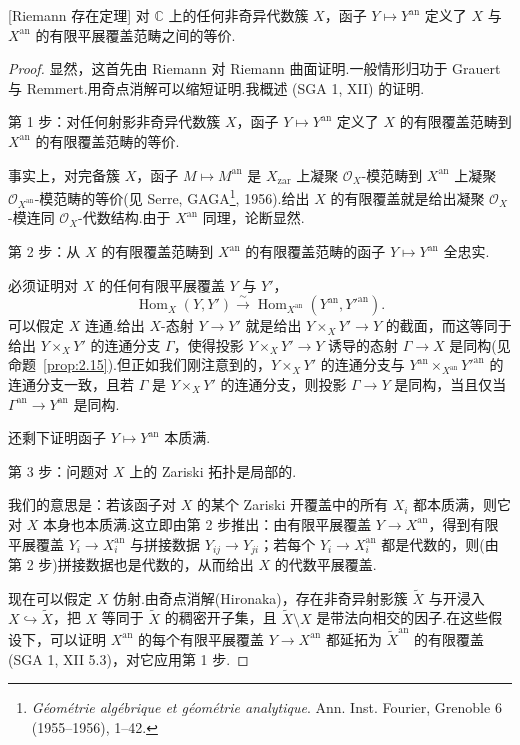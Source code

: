 \begin{theorem}\label{thm:21.3}[Riemann 存在定理]
对 $\mathbb{C}$ 上的任何非奇异代数簇 $X$，函子 $Y \mapsto Y^{\mathrm{an}}$ 定义了 $X$ 与 $X^{\mathrm{an}}$ 的有限平展覆盖范畴之间的等价.
\end{theorem}

\begin{proof}
显然，这首先由 Riemann 对 Riemann 曲面证明.一般情形归功于 Grauert 与 Remmert.用奇点消解可以缩短证明.我概述 (SGA 1, XII) 的证明.

第 1 步：对任何射影非奇异代数簇 $X$，函子 $Y \mapsto Y^{\mathrm{an}}$ 定义了 $X$ 的有限覆盖范畴到 $X^{\mathrm{an}}$ 的有限覆盖范畴的等价.

事实上，对完备簇 $X$，函子 $M \mapsto M^{\mathrm{an}}$ 是 $X_{\mathrm{zar}}$ 上凝聚 $\mathcal{O}_X$-模范畴到 $X^{\mathrm{an}}$ 上凝聚 $\mathcal{O}_{X^{\mathrm{an}}}$-模范畴的等价(见 Serre, GAGA\footnote{\emph{G\'eom\'etrie alg\'ebrique et g\'eom\'etrie analytique}. Ann. Inst. Fourier, Grenoble 6 (1955--1956), 1--42.}, 1956).给出 $X$ 的有限覆盖就是给出凝聚 $\mathcal{O}_X$-模连同 $\mathcal{O}_X$-代数结构.由于 $X^{\mathrm{an}}$ 同理，论断显然.

第 2 步：从 $X$ 的有限覆盖范畴到 $X^{\mathrm{an}}$ 的有限覆盖范畴的函子 $Y \mapsto Y^{\mathrm{an}}$ 全忠实.

必须证明对 $X$ 的任何有限平展覆盖 $Y$ 与 $Y'$，
\[
\operatorname{Hom}_X(Y, Y') \xrightarrow{\sim} \operatorname{Hom}_{X^{\mathrm{an}}}(Y^{\mathrm{an}}, Y'^{\mathrm{an}}).
\]
可以假定 $X$ 连通.给出 $X$-态射 $Y \to Y'$ 就是给出 $Y \times_{X} Y' \to Y$ 的截面，而这等同于给出 $Y \times_{X} Y'$ 的连通分支 $\Gamma$，使得投影 $Y \times_{X} Y' \to Y$ 诱导的态射 $\Gamma \to X$ 是同构(见命题~\ref{prop:2.15}).但正如我们刚注意到的，$Y \times_{X} Y'$ 的连通分支与 $Y^{\mathrm{an}} \times_{X^{\mathrm{an}}} Y'^{\mathrm{an}}$ 的连通分支一致，且若 $\Gamma$ 是 $Y \times_{X} Y'$ 的连通分支，则投影 $\Gamma \to Y$ 是同构，当且仅当 $\Gamma^{\mathrm{an}} \to Y^{\mathrm{an}}$ 是同构.

还剩下证明函子 $Y \mapsto Y^{\mathrm{an}}$ 本质满.

第 3 步：问题对 $X$ 上的 Zariski 拓扑是局部的.

我们的意思是：若该函子对 $X$ 的某个 Zariski 开覆盖中的所有 $X_i$ 都本质满，则它对 $X$ 本身也本质满.这立即由第 2 步推出：由有限平展覆盖 $Y \to X^{\mathrm{an}}$，得到有限平展覆盖 $Y_i \to X^{\mathrm{an}}_i$ 与拼接数据 $Y_{ij} \to Y_{ji}$；若每个 $Y_i \to X^{\mathrm{an}}_i$ 都是代数的，则(由第 2 步)拼接数据也是代数的，从而给出 $X$ 的代数平展覆盖.

现在可以假定 $X$ 仿射.由奇点消解(Hironaka)，存在非奇异射影簇 $\widetilde{X}$ 与开浸入 $X \hookrightarrow \widetilde{X}$，把 $X$ 等同于 $\widetilde{X}$ 的稠密开子集，且 $\widetilde{X} \setminus X$ 是带法向相交的因子.在这些假设下，可以证明 $X^{\mathrm{an}}$ 的每个有限平展覆盖 $Y \to X^{\mathrm{an}}$ 都延拓为 $\widetilde{X}^{\mathrm{an}}$ 的有限覆盖(SGA 1, XII 5.3)，对它应用第 1 步.
\end{proof}

